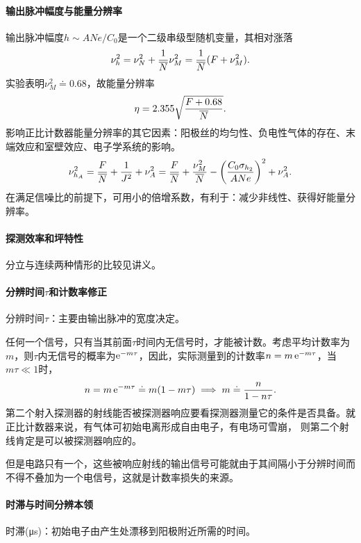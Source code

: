 \paragraph{输出脉冲幅度与能量分辨率}
输出脉冲幅度$h \sim ANe/C_0$是一个二级串级型随机变量，其相对涨落
\begin{equation}\label{eq:nrd-proportional-counter-gain-variance}
	\nu_h^2 = \nu_N^2 + \frac1{\overline{N}}\nu_M^2 = \frac1{\overline{N}}(F + \nu_M^2).
\end{equation}
实验表明$\nu_M^2 \doteq 0.68$，故能量分辨率
\begin{align}
	\eta = 2.355\sqrt{\frac{F + 0.68}{\overline{N}}}.
\end{align}
影响正比计数器能量分辨率的其它因素：阳极丝的均匀性、负电性气体的存在、末端效应和室壁效应、电子学系统的影响。
\[
	\nu_{h_A}^2 = \frac F{\overline{N}} + \frac1{J^2} + \nu_A^2 = \frac F{\overline{N}} + \frac{\nu_M^2}{\overline{N}} - \biggl(\frac{C_0\sigma_{h_2}}{ANe}\biggr)^2 + \nu_A^2.
\]
在满足信噪比的前提下，可用小的倍增系数，有利于：减少非线性、获得好能量分辨率。
\paragraph{探测效率和坪特性}
分立与连续两种情形的比较见讲义。
\paragraph{分辨时间$\tau$和计数率修正}
分辨时间$\tau$：主要由输出脉冲的宽度决定。%

任何一个信号，只有当其前面$\tau$时间内无信号时，才能被计数。考虑平均计数率为$m$，则$\tau$内无信号的概率为$\mathop{}\!\mathrm{e}^{-m\tau}$，因此，实际测量到的计数率$n = m\mathop{}\!\mathrm{e}^{-m\tau}$，当$m\tau \ll 1$时，
\begin{align}
	n = m\mathop{}\!\mathrm{e}^{-m\tau} \doteq m(1 - m\tau) \implies m \doteq \frac n{1 - n\tau}.
\end{align}
第二个射入探测器的射线能否被探测器响应要看探测器测量它的条件是否具备。就正比计数器来说，有气体可初始电离形成自由电子，有电场可雪崩，%
则第二个射线肯定是可以被探测器响应的。%

但是电路只有一个，这些被响应射线的输出信号可能就由于其间隔小于分辨时间而不得不叠加为一个电信号，这就是计数率损失的来源。
\paragraph{时滞与时间分辨本领}
时滞(\unit{\micro\second})：初始电子由产生处漂移到阳极附近所需的时间。

